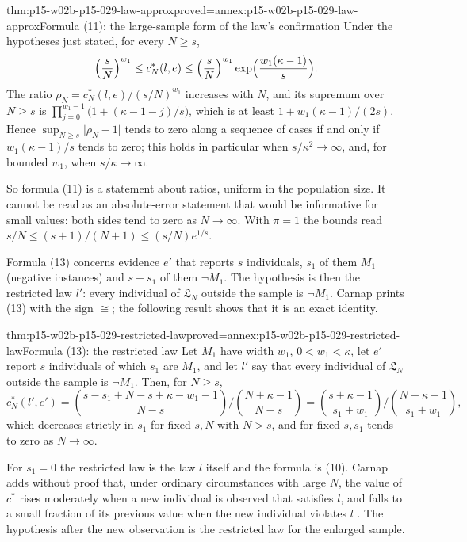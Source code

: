 \begin{hbtheorem}{thm:p15-w02b-p15-029-law-approx}{proved=annex:p15-w02b-p15-029-law-approx}{Formula (11): the large-sample form of the law's confirmation}
Under the hypotheses just stated, for every \(N\geq s\),
\[
 \Bigl(\frac sN\Bigr)^{w_1}\leq c^*_N(l,e)
 \leq\Bigl(\frac sN\Bigr)^{w_1}\exp\Bigl(\frac{w_1(\kappa-1)}s\Bigr).
\]
The ratio \(\rho_N=c^*_N(l,e)/(s/N)^{w_1}\) increases with \(N\), and
its supremum over \(N\geq s\) is
\(\prod_{j=0}^{w_1-1}\bigl(1+(\kappa-1-j)/s\bigr)\), which is at least
\(1+w_1(\kappa-1)/(2s)\). Hence
\(\sup_{N\geq s}\lvert\rho_N-1\rvert\) tends to zero along a sequence
of cases if and only if \(w_1(\kappa-1)/s\) tends to zero; this holds
in particular when \(s/\kappa^2\to\infty\), and, for bounded
\(w_1\), when \(s/\kappa\to\infty\).
\end{hbtheorem}

So formula (11) is a statement about ratios, uniform in the population
size. It cannot be read as an absolute-error statement that would be
informative for small values: both sides tend to zero as
\(N\to\infty\). With \(\pi=1\) the bounds read
\(s/N\leq(s+1)/(N+1)\leq(s/N)e^{1/s}\).

Formula (13) concerns evidence \(e'\) that reports \(s\) individuals,
\(s_1\) of them \(M_1\) (negative instances) and \(s-s_1\) of them
\(\neg M_1\). The hypothesis is then the restricted law \(l'\): every
individual of \(\mathfrak L_N\) outside the sample is \(\neg M_1\).
Carnap prints (13) with the sign \(\cong\); the following result shows
that it is an exact identity.

\begin{hbcorollary}{thm:p15-w02b-p15-029-restricted-law}{proved=annex:p15-w02b-p15-029-restricted-law}{Formula (13): the restricted law}
Let \(M_1\) have width \(w_1\), \(0<w_1<\kappa\), let \(e'\) report
\(s\) individuals of which \(s_1\) are \(M_1\), and let \(l'\) say
that every individual of \(\mathfrak L_N\) outside the sample is
\(\neg M_1\). Then, for \(N\geq s\),
\[
 c^*_N(l',e')=
 \binom{s-s_1+N-s+\kappa-w_1-1}{N-s}\Big/\binom{N+\kappa-1}{N-s}
 =\binom{s+\kappa-1}{s_1+w_1}\Big/\binom{N+\kappa-1}{s_1+w_1},
\]
which decreases strictly in \(s_1\) for fixed \(s,N\) with
\(N>s\), and for fixed \(s,s_1\) tends to zero as \(N\to\infty\).
\end{hbcorollary}

For \(s_1=0\) the restricted law is the law \(l\) itself and the
formula is (10). Carnap adds without proof that, under ordinary
circumstances with large \(N\), the value of \(c^*\) rises moderately
when a new individual is observed that satisfies \(l\), and falls to a
small fraction of its previous value when the new individual violates
\(l\) \cite[sec.~110F, p.~571]{Carnap1950Probability}. The hypothesis
after the new observation is the restricted law for the enlarged
sample.

